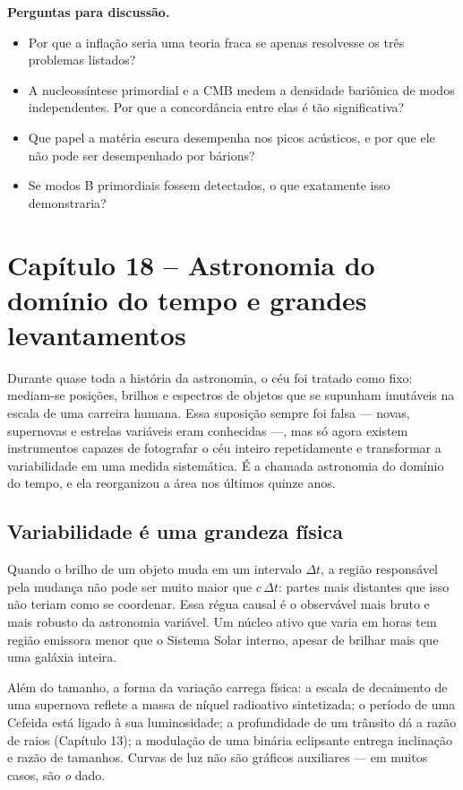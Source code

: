 \documentclass[11pt,a4paper]{article}
\begin{document}
\textbf{Perguntas para discussão.}
\begin{itemize}
\item Por que a inflação seria uma teoria fraca se apenas resolvesse os três problemas listados?
\item A nucleossíntese primordial e a CMB medem a densidade bariônica de modos independentes. Por que a concordância entre elas é tão significativa?
\item Que papel a matéria escura desempenha nos picos acústicos, e por que ele não pode ser desempenhado por bárions?
\item Se modos B primordiais fossem detectados, o que exatamente isso demonstraria?
\end{itemize}
\newpage
\section*{Capítulo 18 -- Astronomia do domínio do tempo e grandes levantamentos}
Durante quase toda a história da astronomia, o céu foi tratado como fixo: mediam-se posições, brilhos e espectros de objetos que se supunham imutáveis na escala de uma carreira humana. Essa suposição sempre foi falsa --- novas, supernovas e estrelas variáveis eram conhecidas ---, mas só agora existem instrumentos capazes de fotografar o céu inteiro repetidamente e transformar a variabilidade em uma medida sistemática. É a chamada astronomia do domínio do tempo, e ela reorganizou a área nos últimos quinze anos.

\subsection*{Variabilidade é uma grandeza física}

Quando o brilho de um objeto muda em um intervalo $\Delta t$, a região responsável pela mudança não pode ser muito maior que $c\,\Delta t$: partes mais distantes que isso não teriam como se coordenar. Essa régua causal é o observável mais bruto e mais robusto da astronomia variável. Um núcleo ativo que varia em horas tem região emissora menor que o Sistema Solar interno, apesar de brilhar mais que uma galáxia inteira.

Além do tamanho, a forma da variação carrega física: a escala de decaimento de uma supernova reflete a massa de níquel radioativo sintetizada; o período de uma Cefeida está ligado à sua luminosidade; a profundidade de um trânsito dá a razão de raios (Capítulo 13); a modulação de uma binária eclipsante entrega inclinação e razão de tamanhos. Curvas de luz não são gráficos auxiliares --- em muitos casos, são \emph{o} dado.
\end{document}
